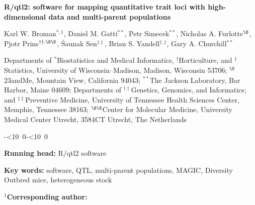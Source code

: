 \documentclass[12pt,letterpaper]{article}
\begin{document}

\vspace*{8mm}
\begin{center}

\textbf{\Large R/qtl2: software for mapping quantitative trait loci
  with high-dimensional data and multi-parent populations}

\bigskip \bigskip \bigskip \bigskip

{\large Karl W. Broman$^{*,1}$, Daniel M. Gatti$^{**}$, Petr Simecek$^{**}$,
  Nicholas A. Furlotte$^{\S}$, \\
  Pjotr Prins$^{\dagger\dagger,\S\S}$, \'Saunak
  Sen$^{\ddagger\ddagger}$, Brian S. Yandell$^{\dagger,\ddagger}$,
  Gary A. Churchill$^{**}$}

\bigskip \bigskip

Departments of $^{*}$Biostatistics and Medical Informatics,
$^{\dagger}$Horticulture, and $^{\ddagger}$Statistics, University of
Wisconsin--Madison, Madison, Wisconsin 53706; $^{\S}$23andMe, Mountain
View, California 94043; $^{**}$The Jackson Laboratory, Bar Harbor, Maine 04609;
Departments of $^{\dagger\dagger}$Genetics, Genomics, and Informatics; and
$^{\ddagger\ddagger}$Preventive Medicine, University of
Tennessee Health Sciences Center, Memphis, Tennessee 38163;
$^{\S\S}$Center for Molecular Medicine, University Medical Center Utrecht, 3584CT Utrecht, The
Netherlands

\end{center}

\def\todayISO{\leavevmode\hbox{\the\year-\twodigits\month-\twodigits\day}}
\def\twodigits#1{\ifnum#1<10 0\fi\the#1}

\vspace{3in} \hfill {\footnotesize \todayISO}

\newpage

\noindent \textbf{Running head:} R/qtl2 software


\bigskip \bigskip \bigskip

\noindent \textbf{Key words:} software, QTL,
multi-parent populations, MAGIC, Diversity Outbred mice, heterogeneous stock




\bigskip \bigskip \bigskip

\noindent \textbf{$^1$Corresponding author:}
\end{document}
